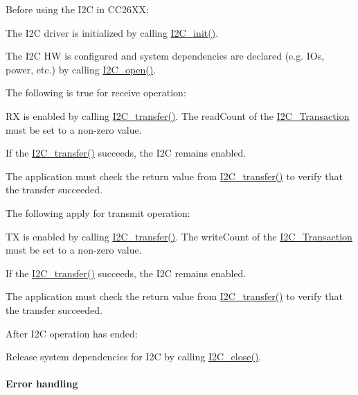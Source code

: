 Before using the I2\+C in C\+C26\+X\+X\+:
\begin{DoxyItemize}
\item The I2\+C driver is initialized by calling \hyperlink{_i2_c_8h_a9ff51ddf1d325776fef90cce0223772b}{I2\+C\+\_\+init()}.
\item The I2\+C H\+W is configured and system dependencies are declared (e.\+g. I\+Os, power, etc.) by calling \hyperlink{_i2_c_8h_ae1aa99e1fee4517406018e10025cca0e}{I2\+C\+\_\+open()}.
\end{DoxyItemize}The following is true for receive operation\+:
\begin{DoxyItemize}
\item R\+X is enabled by calling \hyperlink{_i2_c_8h_ac5d827b67fe77d7d179026941cc069d7}{I2\+C\+\_\+transfer()}. The read\+Count of the \hyperlink{struct_i2_c___transaction}{I2\+C\+\_\+\+Transaction} must be set to a non-\/zero value.
\item If the \hyperlink{_i2_c_8h_ac5d827b67fe77d7d179026941cc069d7}{I2\+C\+\_\+transfer()} succeeds, the I2\+C remains enabled.
\item The application must check the return value from \hyperlink{_i2_c_8h_ac5d827b67fe77d7d179026941cc069d7}{I2\+C\+\_\+transfer()} to verify that the transfer succeeded.
\end{DoxyItemize}The following apply for transmit operation\+:
\begin{DoxyItemize}
\item T\+X is enabled by calling \hyperlink{_i2_c_8h_ac5d827b67fe77d7d179026941cc069d7}{I2\+C\+\_\+transfer()}. The write\+Count of the \hyperlink{struct_i2_c___transaction}{I2\+C\+\_\+\+Transaction} must be set to a non-\/zero value.
\item If the \hyperlink{_i2_c_8h_ac5d827b67fe77d7d179026941cc069d7}{I2\+C\+\_\+transfer()} succeeds, the I2\+C remains enabled.
\item The application must check the return value from \hyperlink{_i2_c_8h_ac5d827b67fe77d7d179026941cc069d7}{I2\+C\+\_\+transfer()} to verify that the transfer succeeded.
\end{DoxyItemize}After I2\+C operation has ended\+:
\begin{DoxyItemize}
\item Release system dependencies for I2\+C by calling \hyperlink{_i2_c_8h_a12c86d89a687f2ee1eb980d99c32326d}{I2\+C\+\_\+close()}.
\end{DoxyItemize}

\paragraph*{Error handling}

